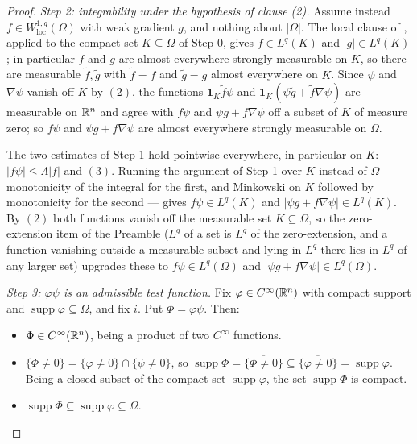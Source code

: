 \begin{proof}
\emph{Step 2: integrability under the hypothesis of clause (2).}  Assume
instead $f\in W^{1,q}_{\mathrm{loc}}(\Omega)$ with weak gradient $g$, and
nothing about $|\Omega|$.  The local clause of , applied
to the compact set $K\subseteq\Omega$ of Step 0, gives $f\in L^q(K)$ and
$|g|\in L^q(K)$; in particular $f$ and $g$ are almost everywhere strongly
measurable on $K$, so there are measurable $\tilde f,\tilde g$ with
$\tilde f=f$ and $\tilde g=g$ almost everywhere on $K$.  Since $\psi$ and
$\nabla\psi$ vanish off $K$ by $(2)$, the functions
$\mathbf1_K\tilde f\psi$ and
$\mathbf1_K(\psi\tilde g+\tilde f\nabla\psi)$ are measurable on $\mathbb{R}^n$ and
agree with $f\psi$ and $\psi g+f\nabla\psi$ off a subset of $K$ of measure
zero; so $f\psi$ and $\psi g+f\nabla\psi$ are almost everywhere strongly
measurable on $\Omega$.

The two estimates of Step 1 hold pointwise everywhere, in particular on $K$:
$|f\psi|\le\Lambda|f|$ and $(3)$.  Running the argument of Step 1 over $K$
instead of $\Omega$ --- monotonicity of the integral for the first, and
Minkowski on $K$ followed by monotonicity for the second --- gives
$f\psi\in L^q(K)$ and $|\psi g+f\nabla\psi|\in L^q(K)$.  By $(2)$ both
functions vanish off the measurable set $K\subseteq\Omega$, so the
zero-extension item of the Preamble ($L^q$ of a set is $L^q$ of the
zero-extension, and a function vanishing outside a measurable subset and lying
in $L^q$ there lies in $L^q$ of any larger set) upgrades these to
$f\psi\in L^q(\Omega)$ and $|\psi g+f\nabla\psi|\in L^q(\Omega)$.

\emph{Step 3: $\varphi\psi$ is an admissible test function.}  Fix
$\varphi\in C^\infty(\mathbb{R}^n)$ with compact support and
$\operatorname{supp}\varphi\subseteq\Omega$, and fix $i$.  Put
$\Phi=\varphi\psi$.  Then:

\begin{itemize}
\item $\Phi\in C^\infty(\mathbb{R}^n)$, being a product of two $C^\infty$ functions.
\item $\{\Phi\ne0\}=\{\varphi\ne0\}\cap\{\psi\ne0\}$, so
  $\operatorname{supp}\Phi=\overline{\{\Phi\ne0\}}
  \subseteq\overline{\{\varphi\ne0\}}=\operatorname{supp}\varphi$.  Being a
  closed subset of the compact set $\operatorname{supp}\varphi$, the set
  $\operatorname{supp}\Phi$ is compact.
\item $\operatorname{supp}\Phi\subseteq\operatorname{supp}\varphi\subseteq\Omega$.
\end{itemize}


\end{proof}
